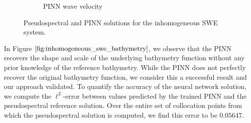 \begin{figure}[h]
\begin{subfigure}[b]{0.45\textwidth}
        \caption{PINN wave velocity}
        \label{fig:inhomogeneous_pinn_swe_velocity}
    \end{subfigure}
    \caption{Pseudospectral and PINN solutions for the inhomogeneous SWE system.}
    \label{fig:inhomogeneous_swe_velocity}
\end{figure}

\pagebreak
In Figure $\ref*{fig:inhomogeneous_swe_bathymetry}$, we observe that the PINN recovers the shape and scale of the 
underlying bathymetry function without any prior knowledge of the reference bathymetry. While the PINN does not 
perfectly recover the original bathymetry function, we consider this a successful result and our approach validated. 
To quantify the accuracy of the neural network solution, we compute the $\ell^2$-error between values predicted by the 
trained PINN and the pseudospectral reference solution. Over the entire set of collocation points from which the 
pseudospectral solution is computed, we find this error to be $0.05647$.

